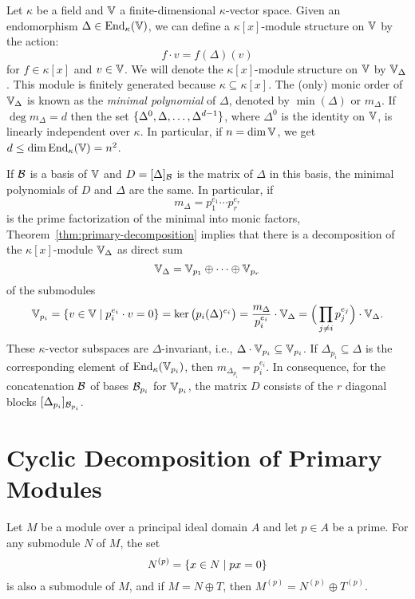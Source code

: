 \begin{xmpl}\label{xmpl:vector-space-as-k[x]-module-1}
    Let $\kappa$ be a field and $\mathbb V$ a finite-dimensional $\kappa$-vector space. Given an endomorphism $\Delta \in {\operatorname{End}}_\kappa(\mathbb V)$, we can define a $\kappa[x]$-module structure on $\mathbb V$ by the action:
    $$
        f \cdot v = f(\Delta)(v)
    $$
    for $f \in \kappa[x]$ and $v \in \mathbb V$. We will denote the $\kappa[x]$-module structure on $\mathbb V$ by $\mathbb V_\Delta$. This module is finitely generated because $\kappa\subseteq\kappa[x]$. The (only) monic order of $\mathbb V_\Delta$ is known as the \textsl{minimal polynomial} of $\Delta$, denoted by $\min(\Delta)$ or $m_\Delta$. If $\deg m_\Delta=d$ then the set $\{\Delta^0,\Delta,\dots,\Delta^{d-1}\}$, where $\Delta^0$ is the identity on $\mathbb V$, is linearly independent over $\kappa$. In particular, if $n=\dim\mathbb V$, we get $d\le\dim{\operatorname{End}}_\kappa(\mathbb V) = n^2$.

    If $\mathcal B$ is a basis of $\mathbb V$ and $D=[\Delta]_{\mathcal B}$ is the matrix of $\Delta$ in this basis, the minimal polynomials of $D$ and $\Delta$ are the same. In particular, if
    $$
        m_\Delta=p_1^{e_1}\cdots p_r^{e_r}
    $$
    is the prime factorization of the minimal into monic factors, Theorem~\ref{thm:primary-decomposition} implies that there is a decomposition of the $\kappa[x]$-module $\mathbb V_\Delta$ as direct sum
    $$
        \mathbb V_\Delta = \mathbb V_{p_1}\oplus\cdots\oplus\mathbb V_{p_r}
    $$
    of the submodules
    $$
        \mathbb V_{p_i} = \{v\in\mathbb V\mid p_i^{e_i}\cdot v=0\}
            = \ker\big(p_i(\Delta)^{e_i}\big)
            =
            \frac{m_\Delta}{p_i^{e_i}}\cdot\mathbb V_\Delta
            = \Big(\prod_{j\ne i}p_j^{e_j}\Big)\cdot\mathbb V_\Delta.
    $$
    These $\kappa$-vector subspaces are $\Delta$-invariant, i.e., $\Delta\cdot\mathbb V_{p_i}\subseteq\mathbb V_{p_i}$. If $\Delta_{p_i}\subseteq\Delta$ is the corresponding element of ${\operatorname{End}}_\kappa(\mathbb V_{p_i})$, then $m_{\Delta_{p_i}}=p_i^{e_i}$. In consequence, for the concatenation $\mathcal B$ of bases $\mathcal B_{p_i}$ for $\mathbb V_{p_i}$, the matrix $D$ consists of the $r$ diagonal blocks $[\Delta_{p_i}]_{\mathcal B_{p_i}}$.
\end{xmpl}

\section{Cyclic Decomposition of Primary Modules}

\begin{lem}
    Let\/ $M$ be a module over a principal ideal domain\/ $A$ and let\/ $p \in A$ be a prime. For any submodule\/ $N$ of\/ $M$, the set
    $$
    N^{(p)} = \{x\in N\mid px=0\}
    $$
    is also a submodule of\/ $M$, and if\/ $M = N \oplus T$, then\/ $M^{(p)} = N^{(p)} \oplus T^{(p)}$.
\end{lem}

